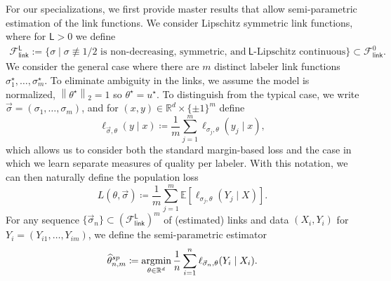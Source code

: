 \documentclass[11pt]{article}
\newcommand{\E}{\mathbb{E}}
\newcommand{\R}{\mathbb{R}} %
\newcommand{\norm}[1]{\left\|{#1}\right\|} %
\newcommand{\what}[1]{\widehat{#1}}
\newcommand{\sem}{^{\textup{sp}}}
\newcommand{\lipconst}{\mathsf{L}}
\newcommand{\loss}{\ell}
\newcommand{\fsymlink}{\mathcal{F}_{\mathsf{link}}^0}
\newcommand{\fsymlinkL}{\mathcal{F}_{\mathsf{link}}^{\mathsf{L}}}
\newcommand{\ltwo}[1]{\norm{#1}_2} %
\newcommand{\<}{\langle} %
\renewcommand{\>}{\rangle}
\DeclareMathOperator*{\argmin}{argmin}
\newcommand{\defeq}{\coloneqq}
\newcommand{\opt}{^\star}
\newcommand{\spe}{\what{\theta}\sem_{n,m}} %
\begin{document}
For our specializations, we first provide master results that
allow semi-parametric estimation of the link functions.  We consider
Lipschitz symmetric link functions, where for $\lipconst > 0$ we define
\begin{align*}
  \fsymlinkL := \{\sigma \mid \sigma \not \equiv 1/2\text{ is non-decreasing,
    symmetric, and} ~ \lipconst\text{-Lipschitz continuous} \}
  \subset \fsymlink.
\end{align*}
We consider the general case where there are $m$ distinct labeler link
functions $\sigma_1\opt, \ldots, \sigma_m\opt$. To eliminate ambiguity
in the links, we
assume the model is normalized, $\ltwo{\theta\opt} = 1$ so $\theta\opt
= u\opt$. To distinguish from the typical case,
we write $\vec{\sigma} = (\sigma_1, \ldots, \sigma_m)$, and for
$(x, y) \in \R^d \times \{\pm 1\}^m$ define
\begin{equation*}
  \loss_{\vec{\sigma}, \theta}(y \mid x)
  \defeq \frac{1}{m} \sum_{j = 1}^m \loss_{\sigma_j,\theta}(y_j \mid x),
\end{equation*}
which allows us to consider both the standard margin-based loss and the case
in which we learn separate measures of quality per labeler.
With this notation, we can then naturally define the population
loss
\begin{equation*}
	L(\theta, \vec{\sigma})
	\defeq \frac{1}{m} \sum_{j = 1}^m
	\E[\loss_{\sigma_j, \theta}(Y_j \mid X)].
\end{equation*}
For any sequence $\{\vec{\sigma}_n\} \subset (\fsymlinkL)^m$ of (estimated)
links
and data
$(X_i, Y_i)$ for $Y_i = (Y_{i1}, \ldots, Y_{im})$, we define the semi-parametric
estimator
\begin{align*}
  \spe \defeq \argmin_{\theta \in \R^d}
  \frac{1}{n} \sum_{i = 1}^n
  \loss_{\vec{\sigma}_n, \theta}(Y_i \mid X_i).
\end{align*}
\end{document}
